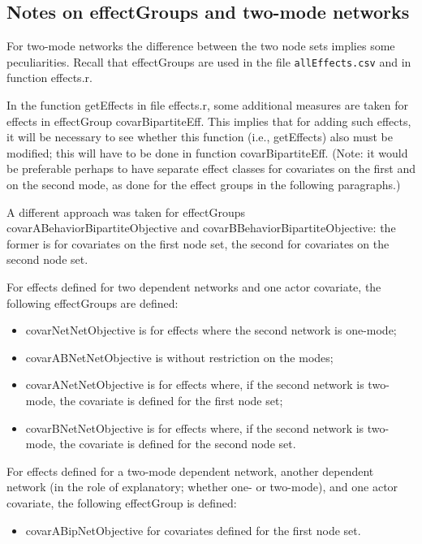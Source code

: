 \documentclass[a4paper,fleqn,11pt]{article}
\newcommand{\+}{\, + \,}
\newcommand{\sfn}[1]{\textsf{#1}}
\begin{document}
\subsection{Notes on effectGroups and two-mode networks}
\label{S_notestwomode}

For two-mode networks the difference between the two node sets implies
some peculiarities.
Recall that effectGroups are used in the file \texttt{allEffects.csv}
and in function \sfn{effects.r}.

In the function \textsf{getEffects} in file \sfn{effects.r}, some additional
measures are taken for effects in effectGroup \sfn{covarBipartiteEff}.
This implies that for adding such effects, it will be necessary to see whether
this function (i.e., \textsf{getEffects}) also must be modified;
this will have to be done in function \sfn{covarBipartiteEff}.
(Note: it would be preferable perhaps to have separate effect classes
for covariates on the first and on the second mode, as done for the effect
groups in the following paragraphs.)

A different approach was taken for effectGroups
\sfn{covarABehaviorBipartiteObjective} and \sfn{covarBBehaviorBipartiteObjective}:
the former is for covariates on the first node set, the second for
covariates on the second node set.

For effects defined for two dependent networks and one actor covariate,
the following effectGroups are defined:
\begin{itemize}
\item \sfn{covarNetNetObjective} is for effects where the second network is one-mode;
\item \sfn{covarABNetNetObjective} is without restriction on the modes;
\item \sfn{covarANetNetObjective}  is for effects where, if the second network is two-mode,
     the covariate is defined for the first node set;
\item \sfn{covarBNetNetObjective} is for effects where, if the second network is two-mode,
     the covariate is defined for the second node set.
\end{itemize}
\medskip

For effects defined for a two-mode dependent network, another dependent
network (in the role of explanatory; whether one- or two-mode), and one actor covariate,
the following effectGroup is defined:
\begin{itemize}
\item \sfn{covarABipNetObjective} for covariates defined for the first node set.
\end{itemize}
\medskip
\end{document}
